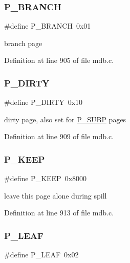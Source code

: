 \subsubsection{\texorpdfstring{P\+\_\+\+B\+R\+A\+N\+CH}{P\_BRANCH}}
{\footnotesize\ttfamily \#define P\+\_\+\+B\+R\+A\+N\+CH~0x01}

branch page 

Definition at line 905 of file mdb.\+c.

\mbox{\label{group__mdb__page_ga80db76242076099b1bbaba0ddec794fb}} 
\subsubsection{\texorpdfstring{P\+\_\+\+D\+I\+R\+TY}{P\_DIRTY}}
{\footnotesize\ttfamily \#define P\+\_\+\+D\+I\+R\+TY~0x10}

dirty page, also set for \mbox{\hyperlink{group__mdb__page_ga77cc6dc98fda40c81fb2f75068fb5551}{P\+\_\+\+S\+U\+BP}} pages 

Definition at line 909 of file mdb.\+c.

\mbox{\label{group__mdb__page_ga1d56f6cd16428f86d1f558668ade8487}} 
\subsubsection{\texorpdfstring{P\+\_\+\+K\+E\+EP}{P\_KEEP}}
{\footnotesize\ttfamily \#define P\+\_\+\+K\+E\+EP~0x8000}

leave this page alone during spill 

Definition at line 913 of file mdb.\+c.

\mbox{\label{group__mdb__page_gac85fb59a9a2eda0d33e58b23a7ca019a}} 
\subsubsection{\texorpdfstring{P\+\_\+\+L\+E\+AF}{P\_LEAF}}
{\footnotesize\ttfamily \#define P\+\_\+\+L\+E\+AF~0x02}

